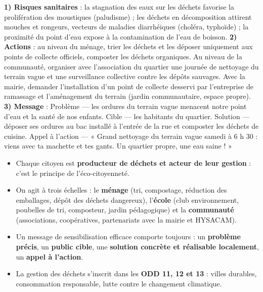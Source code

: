 \documentclass[11pt]{article}
\newcommand{\cle}[1]{{\popxbold\color{popdark}#1}}
\begin{document}
\begin{corrige}[Exercice]
\textbf{1) Risques sanitaires} : la stagnation des eaux sur les déchets favorise la prolifération des moustiques (paludisme) ; les déchets en décomposition attirent mouches et rongeurs, vecteurs de maladies diarrhéiques (choléra, typhoïde) ; la proximité du point d'eau expose à la contamination de l'eau de boisson.
\textbf{2) Actions} : au niveau du ménage, trier les déchets et les déposer uniquement aux points de collecte officiels, composter les déchets organiques. Au niveau de la communauté, organiser avec l'association du quartier une journée de nettoyage du terrain vague et une surveillance collective contre les dépôts sauvages. Avec la mairie, demander l'installation d'un point de collecte desservi par l'entreprise de ramassage et l'aménagement du terrain (jardin communautaire, espace propre).
\textbf{3) Message} : Problème — les ordures du terrain vague menacent notre point d'eau et la santé de nos enfants. Cible — les habitants du quartier. Solution — déposer ses ordures au bac installé à l'entrée de la rue et composter les déchets de cuisine. Appel à l'action — « Grand nettoyage du terrain vague samedi à 6 h 30 : viens avec ta machette et tes gants. Un quartier propre, une eau saine ! »
\end{corrige}

\begin{aretenir}
\begin{itemize}
\item Chaque citoyen est \textbf{producteur de déchets et acteur de leur gestion} : c'est le principe de l'\cle{éco-citoyenneté}.
\item On agit à trois échelles : le \textbf{ménage} (tri, compostage, réduction des emballages, dépôt des déchets dangereux), l'\textbf{école} (club environnement, poubelles de tri, composteur, jardin pédagogique) et la \textbf{communauté} (associations, coopératives, partenariats avec la mairie et HYSACAM).
\item Un message de \cle{sensibilisation} efficace comporte toujours : un \textbf{problème précis}, un \textbf{public cible}, une \textbf{solution concrète et réalisable localement}, un \textbf{appel à l'action}.
\item La gestion des déchets s'inscrit dans les \textbf{ODD 11, 12 et 13} : villes durables, consommation responsable, lutte contre le changement climatique.
\end{itemize}
\end{aretenir}
\end{document}
